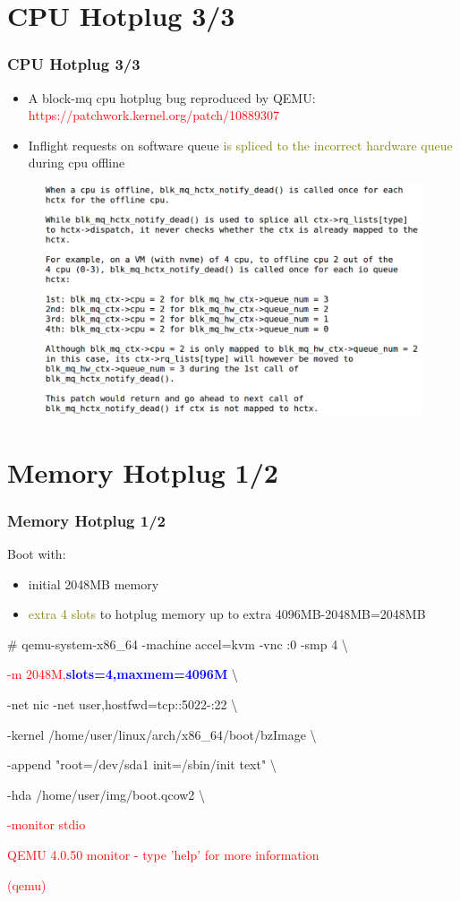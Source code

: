 \documentclass[aspectratio=169]{beamer}
\begin{document}
\section{CPU Hotplug 3/3}
\begin{frame}
\frametitle{CPU Hotplug 3/3}
\footnotesize
\begin{itemize}
\item A block-mq cpu hotplug bug reproduced by QEMU: \textcolor{red}{https://patchwork.kernel.org/patch/10889307}
\item Inflight requests on software queue \textcolor{olive}{is spliced to the incorrect hardware queue} during cpu offline
\end{itemize}
\begin{figure}
\includegraphics[width=0.6\linewidth]{figures/blk-cpu.pdf}
\end{figure}
\end{frame}



\section{Memory Hotplug 1/2}
\begin{frame}
\frametitle{Memory Hotplug 1/2}
Boot with:
\begin{itemize}
\item initial 2048MB memory
\item \textcolor{olive}{extra 4 slots} to hotplug memory up to extra 4096MB-2048MB=2048MB
\end{itemize}
\begin{block}{}

\# qemu-system-x86\_64 -machine accel=kvm -vnc :0 -smp 4 \textbackslash

\textcolor{red}{-m 2048M,\textbf{\textcolor{blue}{slots=4,maxmem=4096M}}} \textbackslash

-net nic -net user,hostfwd=tcp::5022-:22 \textbackslash

-kernel /home/user/linux/arch/x86\_64/boot/bzImage \textbackslash
	
-append "root=/dev/sda1 init=/sbin/init text" \textbackslash

-hda /home/user/img/boot.qcow2 \textbackslash

\textcolor{red}{-monitor stdio}

\textcolor{red}{QEMU 4.0.50 monitor - type 'help' for more information}

\textcolor{red}{(qemu)}
\end{block}
\end{frame}
\end{document}

